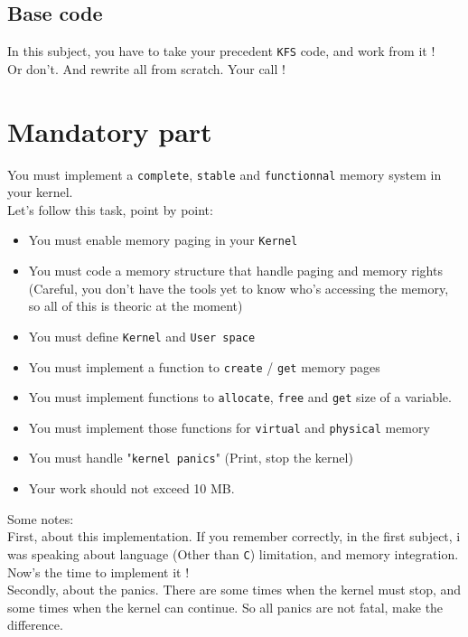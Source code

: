 \documentclass{42-en}
\begin{document}
	\section{Base code}
		In this subject, you have to take your precedent \texttt{KFS} code,
		and work from it !\\ Or don't. And rewrite all from scratch. Your call !

\newpage
\chapter{Mandatory part}

	You must implement a \texttt{complete}, \texttt{stable} and \texttt{functionnal}
	memory system in your kernel.\\
	Let's follow this task, point by point:
	\begin{itemize}\itemsep1pt
		\item You must enable memory paging in your \texttt{Kernel}
		\item You must code a memory structure that handle paging and memory
		rights (Careful, you don't have the tools yet to know who's accessing
		the memory, so all of this is theoric at the moment)
		\item You must define \texttt{Kernel} and \texttt{User space}
		\item You must implement a function to \texttt{create} / \texttt{get}
		memory pages
		\item You must implement functions to \texttt{allocate}, \texttt{free}
		and \texttt{get} size of a variable.
		\item You must implement those functions for \texttt{virtual} and
		\texttt{physical} memory
		\item You must handle "\texttt{kernel panics}" (Print, stop the kernel)
		\item Your work should not exceed 10 MB.
	\end{itemize}

	Some notes:\\
	First, about this implementation. If you remember correctly, in the first subject,
	i was speaking about language (Other than \texttt{C}) limitation,
	and memory integration.
	Now's the time to implement it !\\
	Secondly, about the panics. There are some times when the kernel must stop,
	and some times when the kernel can continue. So all panics are not fatal,
	make the difference.
\end{document}
